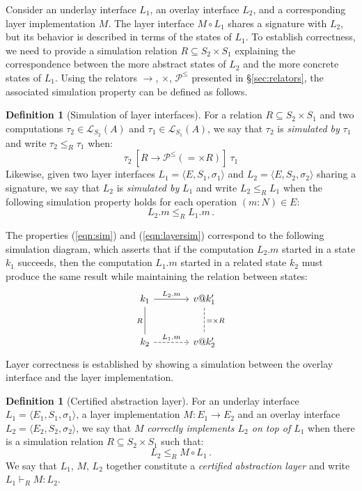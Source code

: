 \documentclass[11pt,oneside,draft]{book}
\theoremstyle{definition}
\newtheorem{definition}[theorem]{Definition}
\begin{document}
Consider an underlay interface $L_1$,
an overlay interface $L_2$,
and a corresponding layer implementation $M$.
The layer interface $M \circ L_1$
shares a signature with $L_2$,
but its behavior is described in terms of
the states of $L_1$.
To establish correctness,
we need to provide a simulation relation
$R \subseteq S_2 \times S_1$
explaining the correspondence between
the more abstract states of $L_2$ and
the more concrete states of $L_1$.
Using the relators $\rightarrow$, $\times$, $\mathcal{P}^\le$
presented in \S\ref{sec:relators},
the associated simulation property can be defined as follows.

\begin{definition}[Simulation of layer interfaces] %
For a relation $R \subseteq S_2 \times S_1$
and two computations
$\tau_2 \in \mathcal{L}_{S_2}(A)$ and
$\tau_1 \in \mathcal{L}_{S_1}(A)$,
we say that $\tau_2$ is \emph{simulated by} $\tau_1$
and write $\tau_2 \le_R \tau_1$
when:
\begin{equation} \label{eqn:sim}
  \tau_2
  \: \mathrel{[R \rightarrow \mathcal{P}^\le({=} \times R)]} \:
  \tau_1
\end{equation}
Likewise,
given two layer interfaces
$L_1 = \langle E, S_1, \sigma_1 \rangle$ and
$L_2 = \langle E, S_2, \sigma_2 \rangle$
sharing a signature,
we say that $L_2$ is \emph{simulated by} $L_1$
and write $L_2 \le_R L_1$ when
the following simulation property holds
for each operation $(m \mathbin: N) \in E$:
\begin{equation}
  \label{eqn:layersim}
  L_2.m \le_R L_1.m
  \,.
\end{equation}
\end{definition}

The properties (\ref{eqn:sim}) and (\ref{eqn:layersim})
correspond to the following simulation diagram,
which asserts that if the computation $L_2.m$
started in a state $k_1$ succeeds,
then the computation $L_1.m$
started in a related state $k_2$ must produce
the same result
while maintaining the relation between states:
\[
  \begin{tikzcd}[sep=large]
    k_1 \ar[r, "L_2.m"] \ar[d, "R"', dash] &
    v@k_1' \ar[d, "{=} \times R", dash, dashed] \\
    k_2 \ar[r, "L_1.m", dashed] &
    v@k_2'
  \end{tikzcd}
\]
Layer correctness is established by showing
a simulation between the overlay interface
and the layer implementation.

\begin{definition}[Certified abstraction layer] %
For an underlay interface $L_1 = \langle E_1, S_1, \sigma_1 \rangle$,
a layer implementation $M : E_1 \rightarrow E_2$ and
an overlay interface $L_2 = \langle E_2, S_2, \sigma_2 \rangle$,
we say that $M$
\emph{correctly implements $L_2$ on top of $L_1$}
when there is a simulation relation $R \subseteq S_2 \times S_1$
such that:
\[
  L_2 \le_R M \circ L_1 \,.
\]
We say that $L_1$, $M$, $L_2$ together
constitute a \emph{certified abstraction layer}
and write $L_1 \vdash_R M : L_2$.
\end{definition}
\end{document}
